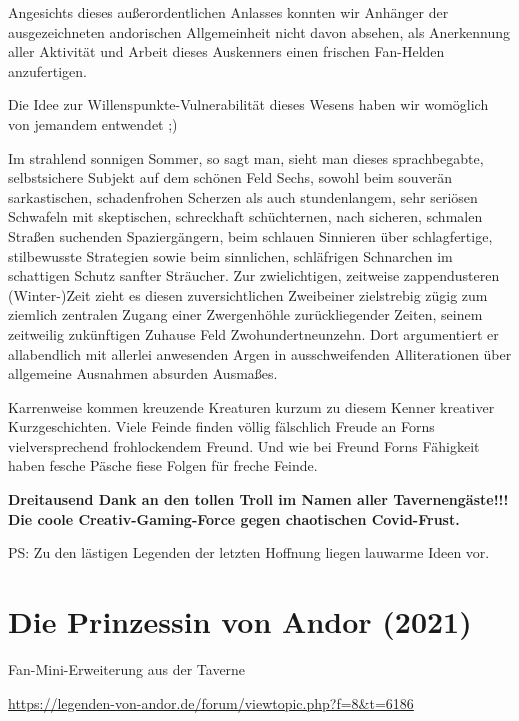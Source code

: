 {Angesichts dieses außerordentlichen Anlasses konnten wir Anhänger der ausgezeichneten andorischen Allgemeinheit nicht davon absehen, als Anerkennung aller Aktivität und Arbeit dieses Auskenners einen frischen Fan-Helden anzufertigen.

Die Idee zur Willenspunkte-Vulnerabilität dieses Wesens haben wir womöglich von jemandem entwendet ;)

Im strahlend sonnigen Sommer, so sagt man, sieht man dieses sprachbegabte, selbstsichere Subjekt auf dem schönen Feld Sechs, sowohl beim souverän sarkastischen, schadenfrohen Scherzen als auch stundenlangem, sehr seriösen Schwafeln mit skeptischen, schreckhaft schüchternen, nach sicheren, schmalen Straßen suchenden Spaziergängern, beim schlauen Sinnieren über schlagfertige, stilbewusste Strategien sowie beim sinnlichen, schläfrigen Schnarchen im schattigen Schutz sanfter Sträucher.
Zur zwielichtigen, zeitweise zappendusteren (Winter-)Zeit zieht es diesen zuversichtlichen Zweibeiner zielstrebig zügig zum ziemlich zentralen Zugang einer Zwergenhöhle zurückliegender Zeiten, seinem zeitweilig zukünftigen Zuhause Feld Zwohundertneunzehn. Dort argumentiert er allabendlich mit allerlei anwesenden Argen in ausschweifenden Alliterationen über allgemeine Ausnahmen absurden Ausmaßes.

Karrenweise kommen kreuzende Kreaturen kurzum zu diesem Kenner kreativer Kurzgeschichten.
Viele Feinde finden völlig fälschlich Freude an Forns vielversprechend frohlockendem Freund.
Und wie bei Freund Forns Fähigkeit haben fesche Päsche fiese Folgen für freche Feinde.

\textbf{Dreitausend Dank an den tollen Troll im Namen aller Tavernengäste!!!}
\textbf{Die coole Creativ-Gaming-Force gegen chaotischen Covid-Frust.}

PS: Zu den lästigen Legenden der letzten Hoffnung liegen lauwarme Ideen vor.






\newpage
\section{Die Prinzessin von Andor (2021)}


\begin{center}
    Fan-Mini-Erweiterung aus der Taverne

    \url{https://legenden-von-andor.de/forum/viewtopic.php?f=8&t=6186}
\end{center}

}
